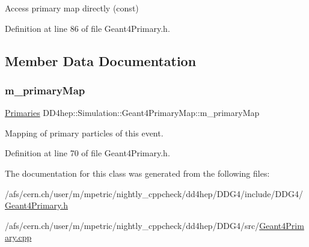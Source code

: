 Access primary map directly (const) 



Definition at line 86 of file Geant4\+Primary.\+h.



\subsection{Member Data Documentation}
\hypertarget{class_d_d4hep_1_1_simulation_1_1_geant4_primary_map_aa3b3cffcec11c5ced24ca4f9ac4e6bde}{}\label{class_d_d4hep_1_1_simulation_1_1_geant4_primary_map_aa3b3cffcec11c5ced24ca4f9ac4e6bde} 
\subsubsection{\texorpdfstring{m\+\_\+primary\+Map}{m\_primaryMap}}
{\footnotesize\ttfamily \hyperlink{class_d_d4hep_1_1_simulation_1_1_geant4_primary_map_aec80e9bb254e582ef410dc65da5809c3}{Primaries} D\+D4hep\+::\+Simulation\+::\+Geant4\+Primary\+Map\+::m\+\_\+primary\+Map\hspace{0.3cm}{\ttfamily [private]}}



Mapping of primary particles of this event. 



Definition at line 70 of file Geant4\+Primary.\+h.



The documentation for this class was generated from the following files\+:\begin{DoxyCompactItemize}
\item 
/afs/cern.\+ch/user/m/mpetric/nightly\+\_\+cppcheck/dd4hep/\+D\+D\+G4/include/\+D\+D\+G4/\hyperlink{_geant4_primary_8h}{Geant4\+Primary.\+h}\item 
/afs/cern.\+ch/user/m/mpetric/nightly\+\_\+cppcheck/dd4hep/\+D\+D\+G4/src/\hyperlink{_geant4_primary_8cpp}{Geant4\+Primary.\+cpp}\end{DoxyCompactItemize}
